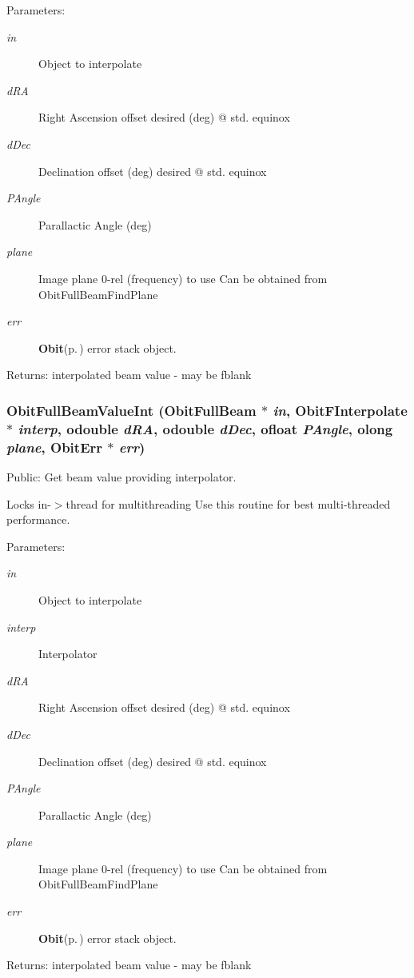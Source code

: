 \begin{Desc}
\item[Parameters:]
\begin{description}
\item[{\em in}]Object to interpolate \item[{\em d\-RA}]Right Ascension offset desired (deg) @ std. equinox \item[{\em d\-Dec}]Declination offset (deg) desired @ std. equinox \item[{\em PAngle}]Parallactic Angle (deg) \item[{\em plane}]Image plane 0-rel (frequency) to use Can be obtained from Obit\-Full\-Beam\-Find\-Plane \item[{\em err}]{\bf Obit}{\rm (p.\,\pageref{structObit})} error stack object. \end{description}
\end{Desc}
\begin{Desc}
\item[Returns:]interpolated beam value - may be fblank \end{Desc}
\subsubsection{ Obit\-Full\-Beam\-Value\-Int ({\bf Obit\-Full\-Beam} $\ast$ {\em in}, {\bf Obit\-FInterpolate} $\ast$ {\em interp}, {\bf odouble} {\em d\-RA}, {\bf odouble} {\em d\-Dec}, {\bf ofloat} {\em PAngle}, {\bf olong} {\em plane}, {\bf Obit\-Err} $\ast$ {\em err})}\label{ObitFullBeam_8c_a13}


Public: Get beam value providing interpolator. 

Locks in-$>$thread for multithreading Use this routine for best multi-threaded performance. \begin{Desc}
\item[Parameters:]
\begin{description}
\item[{\em in}]Object to interpolate \item[{\em interp}]Interpolator \item[{\em d\-RA}]Right Ascension offset desired (deg) @ std. equinox \item[{\em d\-Dec}]Declination offset (deg) desired @ std. equinox \item[{\em PAngle}]Parallactic Angle (deg) \item[{\em plane}]Image plane 0-rel (frequency) to use Can be obtained from Obit\-Full\-Beam\-Find\-Plane \item[{\em err}]{\bf Obit}{\rm (p.\,\pageref{structObit})} error stack object. \end{description}
\end{Desc}
\begin{Desc}
\item[Returns:]interpolated beam value - may be fblank \end{Desc}
